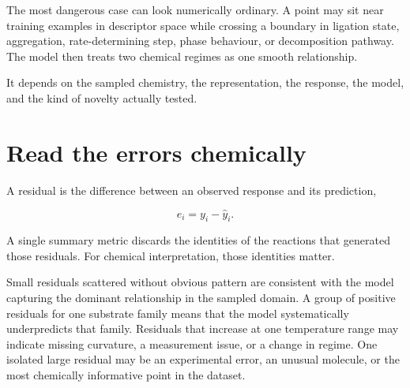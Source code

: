 The most dangerous case can look numerically ordinary.
A point may sit near training examples in descriptor space while crossing a boundary in ligation state, aggregation, rate-determining step, phase behaviour, or decomposition pathway.
The model then treats two chemical regimes as one smooth relationship.


\begin{conceptbox}
  It depends on the sampled chemistry, the representation, the response, the model, and the kind of novelty actually tested.
\end{conceptbox}

\section{Read the errors chemically}

A residual is the difference between an observed response and its prediction,

\begin{equation}
  e_i=y_i-\hat{y}_i.
\end{equation}

A single summary metric discards the identities of the reactions that generated those residuals.
For chemical interpretation, those identities matter.

Small residuals scattered without obvious pattern are consistent with the model capturing the dominant relationship in the sampled domain.
A group of positive residuals for one substrate family means that the model systematically underpredicts that family.
Residuals that increase at one temperature range may indicate missing curvature, a measurement issue, or a change in regime.
One isolated large residual may be an experimental error, an unusual molecule, or the most chemically informative point in the dataset.


